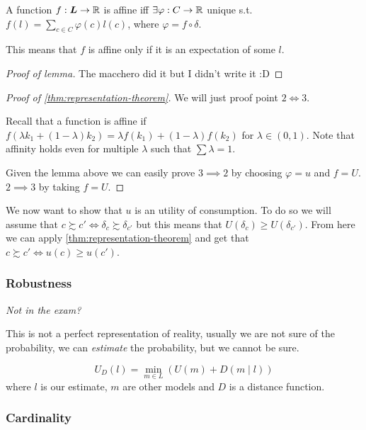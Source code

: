 \documentclass[12pt]{extarticle}
\begin{document}
\begin{lemma}{}{}
    A function $f:\bm L \to \mathbb{R}$ is affine iff $\exists \varphi : C \to \mathbb{R}$ unique s.t. $f(l) = \sum_{c \in C} \varphi(c) l(c)$, where $\varphi = f \circ \delta$.

    This means that $f$ is affine only if it is an expectation of some $l$.
\end{lemma}
\begin{proof}[Proof of lemma]
    The macchero did it but I didn't write it :D
\end{proof}

\begin{proof}[Proof of \cref{thm:representation-theorem}]
    We will just proof point $2 \iff 3$.

    Recall that a function is affine if $f(\lambda k_1 + (1- \lambda) k_2) = \lambda f (k_1) + (1 - \lambda ) f(k_2)$ for $\lambda \in (0, 1)$.
    Note that affinity holds even for multiple $\lambda$ such that $\sum \lambda = 1$.

    Given the lemma above we can easily prove $3 \implies 2$ by choosing $\varphi = u$ and $f = U$.
    $2 \implies 3$  by taking $f = U$.
\end{proof}

We now want to show that $u$ is an utility of consumption.
To do so we will assume that $c \succsim c' \iff \delta_c \succsim \delta_{c'}$ but this means that $U(\delta_c) \geq U(\delta_{c'})$.
From here we can apply \cref{thm:representation-theorem} and get that $c \succsim c' \iff u(c) \geq u(c')$.

\subsubsection{Robustness}

\emph{Not in the exam?}

This is not a perfect representation of reality, usually we are not sure of the probability, we can \emph{estimate} the probability, but we cannot be sure.

\begin{equation}
    U_D(l) = \min_{m \in L} \left( U(m) + D(m \mid l) \right)
\end{equation}
where $l$ is our estimate, $m$ are other models and $D$ is a distance function.

\subsubsection{Cardinality}
\end{document}
